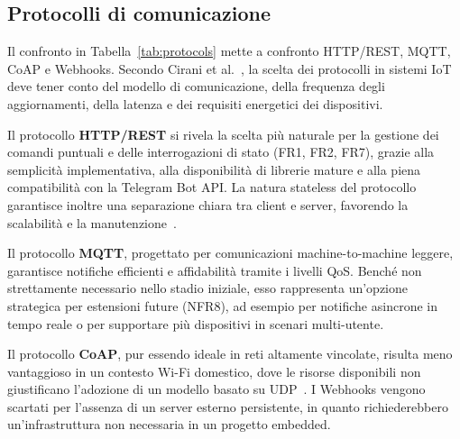    \subsection{Protocolli di comunicazione} Il confronto in Tabella~\ref{tab:protocols} mette a confronto HTTP/REST, MQTT, CoAP e Webhooks. Secondo Cirani et al.~\cite{Cirani2019}, la scelta dei protocolli in sistemi IoT deve tener conto del modello di comunicazione, della frequenza degli aggiornamenti, della latenza e dei requisiti energetici dei dispositivi. 
   
   Il protocollo \textbf{HTTP/REST} si rivela la scelta più naturale per la gestione dei comandi puntuali e delle interrogazioni di stato (FR1, FR2, FR7), grazie alla semplicità implementativa, alla disponibilità di librerie mature e alla piena compatibilità con la Telegram Bot API. La natura stateless del protocollo garantisce inoltre una separazione chiara tra client e server, favorendo la scalabilità e la manutenzione~\cite{Guinard2016}. 
   
   Il protocollo \textbf{MQTT}, progettato per comunicazioni machine-to-machine leggere, garantisce notifiche efficienti e affidabilità tramite i livelli QoS. Benché non strettamente necessario nello stadio iniziale, esso rappresenta un’opzione strategica per estensioni future (NFR8), ad esempio per notifiche asincrone in tempo reale o per supportare più dispositivi in scenari multi-utente. 
   
   Il protocollo \textbf{CoAP}, pur essendo ideale in reti altamente vincolate, risulta meno vantaggioso in un contesto Wi-Fi domestico, dove le risorse disponibili non giustificano l’adozione di un modello basato su UDP~\cite{Shelby2014}. I Webhooks vengono scartati per l’assenza di un server esterno persistente, in quanto richiederebbero un’infrastruttura non necessaria in un progetto embedded.
   
